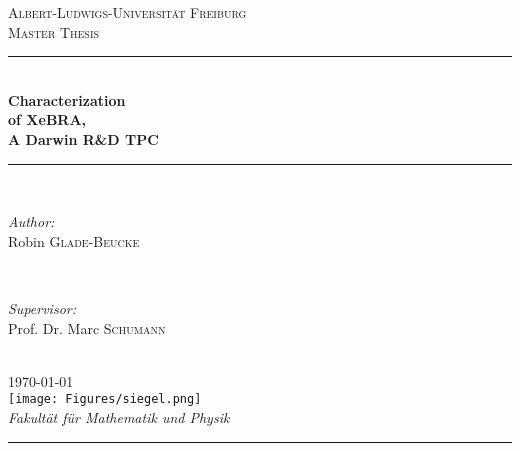 \begin{titlepage}
\newcommand{\HRule}{\rule{\linewidth}{0.25mm}} %
\center
\textsc{\LARGE Albert-Ludwigs-Universit\"{a}t Freiburg}\\[1.5cm]
\textsc{\Large Master Thesis}\\[0.4cm]
\HRule \\[0.4cm]
\huge \textbf{Characterization}\\\textbf{of Xe\textsc{BRA},}\\\textbf{A Darwin R\&D TPC}  %
\HRule \\[1.0cm]
\begin{minipage}{0.4\textwidth}
\begin{flushleft} \large
\emph{Author:}\\
Robin \textsc{Glade-Beucke} \\
\end{flushleft}
\end{minipage}
~
\begin{minipage}{0.4\textwidth}
\begin{flushright} \large
\emph{Supervisor:} \\
Prof. Dr. Marc \textsc{Schumann} \\
\end{flushright}
\end{minipage}\\[1cm]

{\large \today}\\[0.8cm]

\texttt{[image: Figures/siegel.png]}\\[1cm]

\large \emph{Fakult\"{a}t f\"{u}r Mathematik und Physik}\\[0.4cm]

\HRule \\
\setcounter{page}{0}
\end{titlepage}
